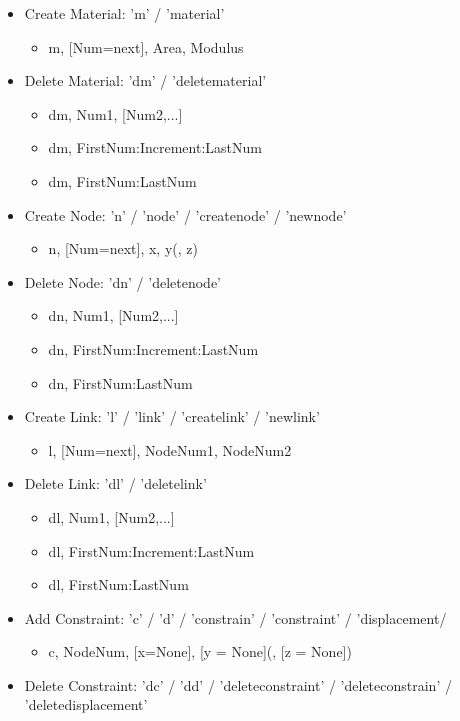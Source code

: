 \documentclass[11pt, oneside]{article}   	%
\begin{document}
\begin{itemize}
 \item{Create Material: 'm' / 'material'} 
 	\begin{itemize}
 		\item m, [Num=next], Area, Modulus
	\end{itemize}
 \item{Delete Material: 'dm' / 'deletematerial'}
 	\begin{itemize}
 		\item dm, Num1, [Num2,...]
		\item dm, FirstNum:Increment:LastNum
		\item dm, FirstNum:LastNum
	\end{itemize}
 \item{Create Node: 'n' / 'node' / 'createnode' / 'newnode'}
 	\begin{itemize}
 		\item n, [Num=next], x, y(, z)
	\end{itemize}
\item{Delete Node: 'dn' / 'deletenode'}
 	\begin{itemize}
 		\item dn, Num1, [Num2,...]
		\item dn, FirstNum:Increment:LastNum
		\item dn, FirstNum:LastNum
	\end{itemize}
 \item{Create Link: 'l' / 'link' / 'createlink' / 'newlink'}
 	\begin{itemize}
 		\item l, [Num=next], NodeNum1, NodeNum2
	\end{itemize}
\item{Delete Link: 'dl' / 'deletelink'}
 	\begin{itemize}
 		\item dl, Num1, [Num2,...]
		\item dl, FirstNum:Increment:LastNum
		\item dl, FirstNum:LastNum
	\end{itemize}
\item{Add Constraint: 'c' / 'd' / 'constrain' / 'constraint' / 'displacement/}
	\begin{itemize}
		\item c, NodeNum, [x=None], [y = None](, [z = None])
	\end{itemize}
\item{Delete Constraint: 'dc' / 'dd' / 'deleteconstraint' / 'deleteconstrain' / 'deletedisplacement'}

\end{itemize}
\end{document}
